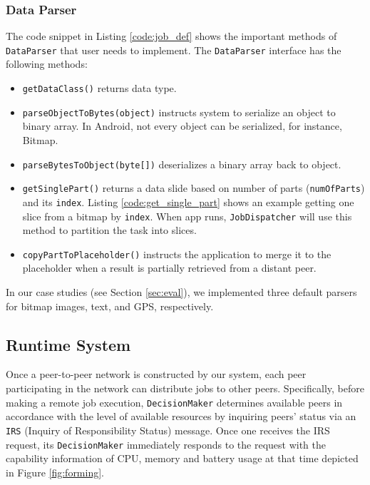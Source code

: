 \documentclass{sig-alternate}[10pt]
\begin{document}
\subsubsection{Data Parser} \label{data_parser}
The code snippet in Listing \ref{code:job_def} shows the important methods of \texttt{DataParser} that user needs to implement. The \texttt{DataParser} interface has the following methods:
\begin{itemize}
	\item \texttt{getDataClass()} returns data type.
	\item \texttt{parseObjectToBytes(object)} instructs system to serialize an object to binary array. In Android, not every object can be serialized, for instance, Bitmap.  
	\item \texttt{parseBytesToObject(byte[])} deserializes a binary array back to object.
	\item \texttt{getSinglePart()} returns a data slide based on number of parts (\texttt{numOfParts}) and its \texttt{index}. Listing \ref{code:get_single_part} shows an example getting one slice from a bitmap by \texttt{index}. When app runs, \texttt{JobDispatcher} will use this method to partition the task into slices.
	\item \texttt{copyPartToPlaceholder()} instructs the application to merge it to the placeholder when a result is partially retrieved from a distant peer.
\end{itemize}

In our case studies (see Section \ref{sec:eval}), we implemented three default parsers for bitmap images, text, and GPS, respectively. 

\subsection{Runtime System} \label{scheduling}
Once a peer-to-peer network is constructed by our system, each peer participating in the network can distribute jobs to other peers. Specifically, before making a remote job execution, \texttt{DecisionMaker} determines available peers in accordance with the level of available resources by inquiring peers' status via an \texttt{IRS} (Inquiry of Responsibility Status) message. Once one receives the IRS request, its \texttt{DecisionMaker} immediately responds to the request with the capability information of CPU, memory and battery usage at that time depicted in Figure \ref{fig:forming}.

\end{document}
